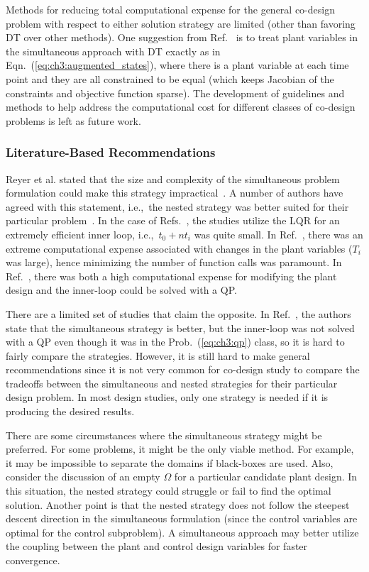 Methods for reducing total computational expense for the general co-design problem with respect to either solution strategy are limited (other than favoring DT over other methods).
One suggestion from Ref.~\cite{Kelly2015a} is to treat plant variables in the simultaneous approach with DT exactly as in Eqn.~(\ref{eq:ch3:augmented_states}), where there is a plant variable at each time point and they are all constrained to be equal (which keeps Jacobian of the constraints and objective function sparse).
The development of guidelines and methods to help address the computational cost for different classes of co-design problems is left as future work.

\subsubsection{Literature-Based Recommendations}

Reyer et al. stated that the size and complexity of the simultaneous problem formulation could make this strategy impractical~\cite{Reyer2001a}.  
A number of authors have agreed with this statement, i.e.,~the nested strategy was better suited for their particular problem~\cite{Onoda1987a, Belvin1990a, Deshmukh2016a,Chilan2017a}.
In the case of Refs.~\cite{Onoda1987a, Belvin1990a}, the studies utilize the LQR for an extremely efficient inner loop, i.e.,~$t_0 + n t_i$ was quite small.
In Ref.~\cite{Deshmukh2016a}, there was an extreme computational expense associated with changes in the plant variables ($T_i$ was large), hence minimizing the number of function calls was paramount.
In Ref.~\cite{Chilan2017a}, there was both a high computational expense for modifying the plant design and the inner-loop could be solved with a QP.

There are a limited set of studies that claim the opposite. 
In Ref.~\cite{Allison2014b}, the authors state that the simultaneous strategy is better, but the inner-loop was not solved with a QP even though it was in the Prob.~(\ref{eq:ch3:qp}) class, so it is hard to fairly compare the strategies.
However, it is still hard to make general recommendations since it is not very common for co-design study to compare the tradeoffs between the simultaneous and nested strategies for their particular design problem. In most design studies, only one strategy is needed if it is producing the desired results.

There are some circumstances where the simultaneous strategy might be preferred.
For some problems, it might be the only viable method. For example, it may be impossible to separate the domains if black-boxes are used.
Also, consider the discussion of an empty $\Omega$ for a particular candidate plant design.
In this situation, the nested strategy could struggle or fail to find the optimal solution.
Another point is that the nested strategy does not follow the steepest descent direction in the simultaneous formulation (since the control variables are optimal for the control subproblem).
A simultaneous approach may better utilize the coupling between the plant and control design variables for faster convergence.


